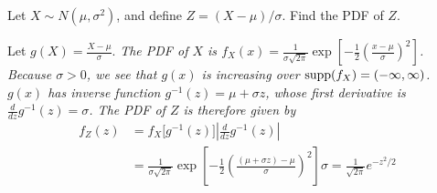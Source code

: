 \begin{example}
Let $X\sim N(\mu,\sigma^2)$, and define $Z=(X-\mu)/\sigma$. Find the PDF of $Z$.
\end{example}
\begin{solution}
Let $g(X) = \displaystyle \frac{X-\mu}{\sigma}$. 
\bit
\it The PDF of $X$ is $f_X(x) = \displaystyle\frac{1}{\sigma\sqrt{2\pi}}\exp\left[-\frac{1}{2}\left(\frac{x-\mu}{\sigma}\right)^2\right]$.
\it Because $\sigma>0$, we see that $g(x)$ is increasing over $\text{supp}(f_X) = (-\infty,\infty)$.
\it $g(x)$ has inverse function $g^{-1}(z) = \mu + \sigma z$, whose first derivative is $\displaystyle\frac{d}{dz}g^{-1}(z) = \sigma$.
\eit
The PDF of $Z$ is therefore given by
\begin{align*}
f_Z(z)
	& = f_X\big[g^{-1}(z)\big]\left|\frac{d}{dz}g^{-1}(z)\right| \\
	& = \frac{1}{\sigma\sqrt{2\pi}}\exp\left[-\frac{1}{2}\left(\frac{(\mu+\sigma z)-\mu}{\sigma}\right)^2\right]\sigma
	  = \frac{1}{\sqrt{2\pi}}e^{-z^2/2}
\end{align*}
\end{solution}



